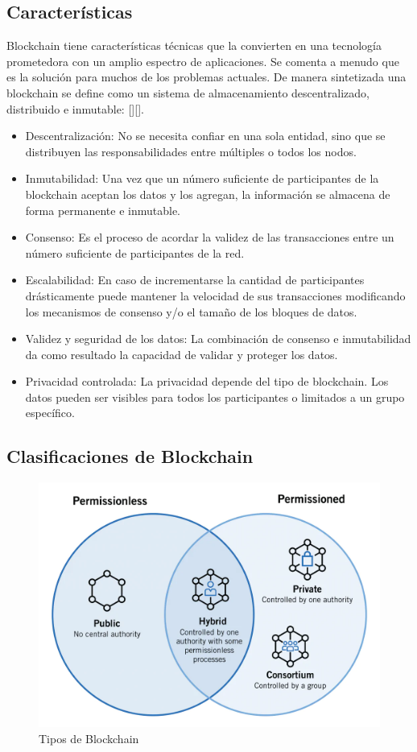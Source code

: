 \subsection{Características}
Blockchain tiene características técnicas que la convierten en una tecnología prometedora con un amplio espectro de aplicaciones. Se comenta a menudo que es la solución para muchos de los problemas actuales. De manera sintetizada una blockchain se define como un sistema de almacenamiento descentralizado, distribuido e inmutable: [\cite{zheng2017overview}][\cite{makridakis2019blockchain}].
\begin{itemize}
	\item Descentralización: No se necesita confiar en una sola entidad, sino que se distribuyen las responsabilidades entre múltiples o todos los nodos.
	\item Inmutabilidad: Una vez que un número suficiente de participantes de la blockchain aceptan los datos y los agregan, la información se almacena de forma permanente e inmutable.
	\item Consenso: Es el proceso de acordar la validez de las transacciones entre un número suficiente de participantes de la red.
	\item Escalabilidad: En caso de incrementarse la cantidad de participantes drásticamente puede mantener la velocidad de sus transacciones modificando los mecanismos de consenso y/o el tamaño de los bloques de datos.
	\item Validez y seguridad de los datos: La combinación de consenso e inmutabilidad da como resultado la capacidad de validar y proteger los datos.
	\item Privacidad controlada: La privacidad depende del tipo de blockchain. Los datos pueden ser visibles para todos los participantes o limitados a un grupo específico.
\end{itemize}

\subsection{Clasificaciones de Blockchain}

\begin{figure}[h!]
	\centering
	\includegraphics[width=\linewidth]{Graphics/bc_types.png}
	\caption{Tipos de Blockchain}
	\label{fig:1}
\end{figure}

